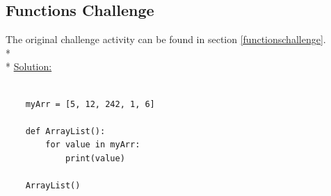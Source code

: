 \documentclass[12pt, letterpaper]{article}
\begin{document}
    \subsection{Functions Challenge} \label{functionsol}

    The original challenge activity can be found in section \ref{functionschallenge}. \\* \\*
    \underline{Solution:}

    \begin{verbatim}

    myArr = [5, 12, 242, 1, 6]

    def ArrayList():
        for value in myArr:
            print(value)
    
    ArrayList()
    
    \end{verbatim}
\end{document}
